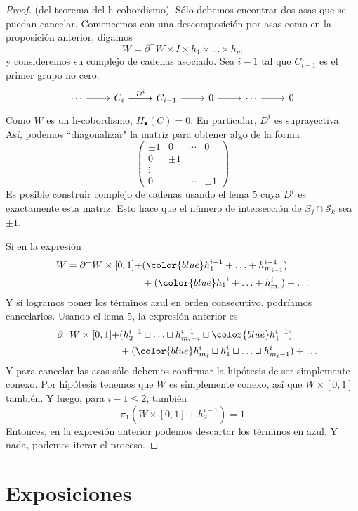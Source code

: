 \documentclass[spanish]{book}
\theoremstyle{definition}
\begin{document}
\begin{proof}
	(del teorema del h-cobordismo). Sólo debemos encontrar dos asas que se puedan cancelar. Comencemos con una descomposición por asas como en la proposición anterior, digamos
	\[W=\partial^-W\times I\times h_1\times\ldots\times h_m\]
	y consideremos su complejo de cadenas asociado. Sea $i-1$ tal que $C_{i-1}$ es el primer grupo no cero.
	\[\begin{tikzcd}
		\cdots\arrow[r]&C_i\arrow[r,"D^i"]\arrow[r]&C_{i-1}\arrow[r]&0\arrow[r]&\cdots\arrow[r]&0
	\end{tikzcd}\]
	Como $W$ es un h-cobordismo, $H_\bullet(C)=0$. En particular, $D^i$ es suprayectiva. Así, podemos ``diagonalizar" la matriz para obtener algo de la forma
	\[\left(\begin{matrix}
		\pm1&0&\cdots &0\\
		0&\pm1\\
		\vdots&&\\
		0&&\cdots&\pm1
	\end{matrix}\right)\]
	Es posible construir complejo de cadenas usando el lema 5 cuya $D^i$ es exactamente esta matriz. Esto hace que el número de intersección de $S_j\cap\mathcal{S}_k$ sea $\pm1$.
	
	Si en la expresión
	\begin{align*}
		W=\partial^-W\times[0,1]+&({\color{blue}h_1^{i-1}}+\ldots+h_{m_{i-1}}^{i-1})\\
		&+({\color{blue}h_1}^i+\ldots+h^i_{m_{i}})+\ldots
	\end{align*}
	Y si logramos poner los términos azul en orden consecutivo, podríamos cancelarlos. Usando el lema 5, la expresión anterior es
	\begin{align*}
		=\partial^-W\times[0,1]+&(h_2^{i-1}\sqcup\ldots\sqcup h^{i-1}_{m_i-i}\sqcup {\color{blue}h_1^{i-1}})\\
		&+({\color{blue}h_{m_i}^i}\sqcup h_1^i\sqcup\ldots\sqcup h_{m_i-1}^i)+\ldots
	\end{align*}
	Y para cancelar las asas sólo debemos confirmar la hipótesis de ser simplemente conexo. Por hipótesis tenemos que $W$ es simplemente conexo, así que $W\times[0,1]$ también. Y luego, para $i-1\leq2$, también
	\[\pi_1(W\times[0,1]+h_2^{i-1})=1\]
	Entonces, en la expresión anterior podemos descartar los términos en azul. Y nada, podemos iterar el proceso.
\end{proof}

\clearpage
\chapter{Exposiciones}
\end{document}
